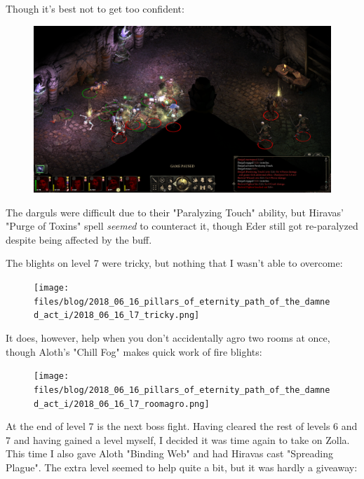 \documentclass{article}
\begin{document}
Though it's best not to get too confident:

\begin{figure}
\includegraphics[scale=0.33]{files/blog/2018_06_16_pillars_of_eternity_path_of_the_damned_act_i/2018_06_16_l6_darguls.png}
\end{figure}

The darguls were difficult due to their "Paralyzing Touch" ability, but Hiravas' "Purge of Toxins" spell \emph{seemed} to counteract it, though Eder still got re-paralyzed despite being affected by the buff.

The blights on level 7 were tricky, but nothing that I wasn't able to overcome:

\begin{figure}
\texttt{[image: files/blog/2018\_06\_16\_pillars\_of\_eternity\_path\_of\_the\_damned\_act\_i/2018\_06\_16\_l7\_tricky.png]}
\end{figure}

It does, however, help when you don't accidentally agro two rooms at once, though Aloth's "Chill Fog" makes quick work of fire blights:

\begin{figure}
\texttt{[image: files/blog/2018\_06\_16\_pillars\_of\_eternity\_path\_of\_the\_damned\_act\_i/2018\_06\_16\_l7\_roomagro.png]}
\end{figure}

At the end of level 7 is the next boss fight.  Having cleared the rest of levels 6 and 7 and having gained a level myself, I decided it was time again to take on Zolla.  This time I also gave Aloth "Binding Web" and had Hiravas cast "Spreading Plague".  The extra level seemed to help quite a bit, but it was hardly a giveaway:
\end{document}
